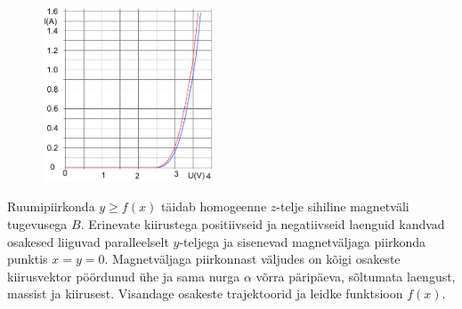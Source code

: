 \setAuthor{}

\begin{figure}
\vspace{-15pt}
\includegraphics[width = 0.45\textwidth]{2020-v2g-09-yl.pdf}
\end{figure}



Ruumipiirkonda $y\ge f(x)$ täidab homogeenne $z$-telje sihiline magnetväli tugevusega $B$. Erinevate kiirustega positiivseid ja negatiivseid laenguid kandvad osakesed liiguvad paralleelselt $y$-teljega ja sisenevad magnetväljaga piirkonda punktis $x=y=0$. Magnetväljaga piirkonnast väljudes on kõigi osakeste kiirusvektor pöördunud ühe ja sama nurga $\alpha$ võrra päripäeva, sõltumata laengust, massist ja kiirusest. Visandage osakeste trajektoorid ja leidke funktsioon $f(x)$. 

\hint

